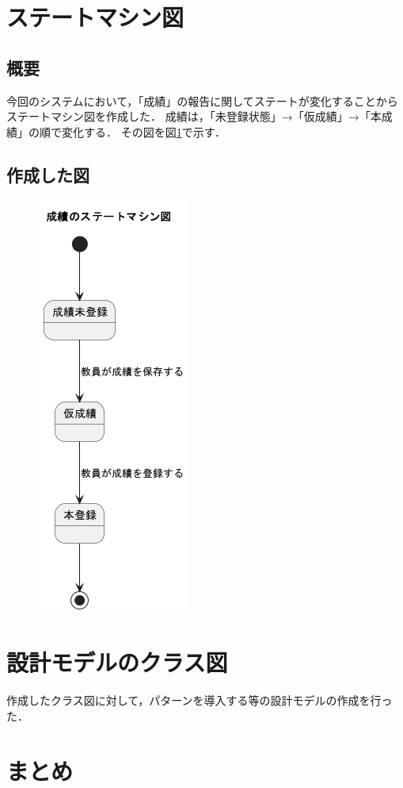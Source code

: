 \documentclass[documentclass]{jsarticle}
\begin{document}
\section{ステートマシン図}
\subsection*{概要}
今回のシステムにおいて，「成績」の報告に関してステートが変化することからステートマシン図を作成した．
成績は，「未登録状態」→「仮成績」→「本成績」の順で変化する．
その図を図\ref*{fig:8-1}で示す．

\subsection*{作成した図}
\begin{figure}[H]
  \begin{center}
    \includegraphics*[scale=0.6]{figure/8-1.png}
  \end{center}
  \caption{}
  \label{fig:8-1}
\end{figure}

\newpage

\section{設計モデルのクラス図}
作成したクラス図に対して，パターンを導入する等の設計モデルの作成を行った．

\section{まとめ}
\end{document}
